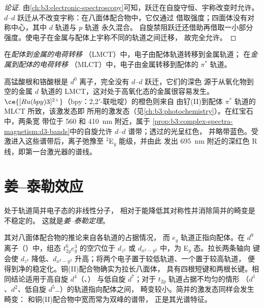 \begin{proof}[论证]
由\cref{ch:b3:electronic-spectroscopy}可知，跃迁在自旋守恒、宇称改变时允许。
$d$--$d$ 跃迁从不改变宇称：在八面体配合物中，它仅通过
借取强度；四面体没有对称中心，其中 $d$ 轨道与 $p$ 轨道
永久混合。
自旋禁阻跃迁还借助再借取一小部分
强度。使电子在金属与配体上宇称不同的轨道之间迁移，
故完全允许。
\end{proof}

\begin{definition}[电荷转移]\label{def:b3:complex-spectra-magnetism:ct}
在\emph{配体到金属的电荷转移}
（LMCT）中，电子由配体轨道转移到金属轨道；
在\emph{金属到配体的电荷转移}
（MLCT）中，电子由金属转移到配体的 $\pi^*$ 轨道。
\end{definition}

高锰酸根和铬酸根是 $d^0$ 离子，完全没有 $d$--$d$ 跃迁，它们的深色
源于从氧化物到空的金属 $d$ 轨道的 LMCT，这对处于高氧化态的金属很容易发生。
$\ce{[Ru(bpy)3]^{2+}}$（bpy：2,2$'$-联吡啶）的橙色则来自
由钌(II)到配体 $\pi^*$ 轨道的 MLCT 所致，该激发态即
所用的激发态（见\cref{ch:b3:photochemistry}）。在红宝石中，两条宽
带位于 560 和 \qty{410}{nm} 附近，属于
\cref{prop:b3:complex-spectra-magnetism:d3-bands}中的自旋允许 $d$--$d$ 谱带；透过的光呈红色，
并略带蓝色。受激进入这些谱带后，离子弛豫至 $^2$E$_g$ 能级，并由此
发出 \qty{695}{nm} 附近的深红色 R 线，即第一台激光器的谱线。

\section{姜–泰勒效应}

\begin{theorem}[姜–泰勒定理]\label{thm:b3:complex-spectra-magnetism:jahn-teller}
处于轨道简并电子态的非线性分子，
相对于能降低其对称性并消除简并的畸变是不稳定的。
这就是\emph{姜–泰勒定理}。
\end{theorem}

\admitted

其对八面体配合物的推论来自各轨道的占据情况，
而 $e_g$ 轨道正指向配体。在 $d^9$ 离子（）中，组态
$t_{2g}^6e_g^3$ 的空穴位于 $d_{z^2}$ 或 $d_{x^2-y^2}$ 中，为 E$_g$ 态。拉长两条轴向
键会使 $d_{z^2}$ 降低、$d_{x^2-y^2}$ 升高；将两个电子置于较低轨道、一个置于较高轨道，
便得到净的稳定化。铜(II)配合物确实为拉长八面体，
具有四根短键和两根长键。相同结论适用于高自旋 $d^4$（、）
与低自旋 $d^7$；对于 $t_{2g}$ 轨道占据不均匀的情形
（$d^1$、$d^2$、低自旋 $d^5$\dots）的轨道指向配体之间，
畸变较小。简并的激发态同样会发生畸变：
和铜(II)配合物中宽而常为双峰的谱带，
正是其光谱特征。

